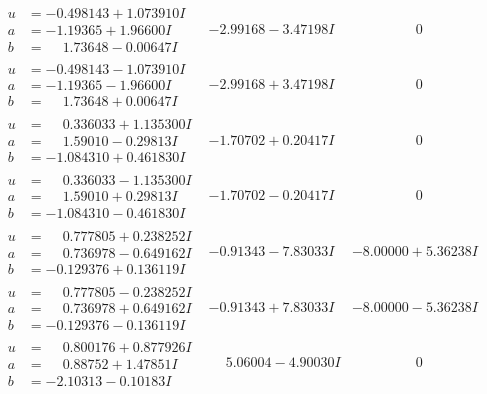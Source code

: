 \documentclass[1p]{elsarticle_modified}
\theoremstyle{definition}
\begin{document}
$$\begin{array}{c|c|c}
\begin{aligned}
u &= -0.498143 + 1.073910 I \\
a &= -1.19365 + 1.96600 I \\
b &= \phantom{-}1.73648 - 0.00647 I\end{aligned}
 & -2.99168 - 3.47198 I & \phantom{-0.000000 } 0 \\ \hline\begin{aligned}
u &= -0.498143 - 1.073910 I \\
a &= -1.19365 - 1.96600 I \\
b &= \phantom{-}1.73648 + 0.00647 I\end{aligned}
 & -2.99168 + 3.47198 I & \phantom{-0.000000 } 0 \\ \hline\begin{aligned}
u &= \phantom{-}0.336033 + 1.135300 I \\
a &= \phantom{-}1.59010 - 0.29813 I \\
b &= -1.084310 + 0.461830 I\end{aligned}
 & -1.70702 + 0.20417 I & \phantom{-0.000000 } 0 \\ \hline\begin{aligned}
u &= \phantom{-}0.336033 - 1.135300 I \\
a &= \phantom{-}1.59010 + 0.29813 I \\
b &= -1.084310 - 0.461830 I\end{aligned}
 & -1.70702 - 0.20417 I & \phantom{-0.000000 } 0 \\ \hline\begin{aligned}
u &= \phantom{-}0.777805 + 0.238252 I \\
a &= \phantom{-}0.736978 - 0.649162 I \\
b &= -0.129376 + 0.136119 I\end{aligned}
 & -0.91343 - 7.83033 I & -8.00000 + 5.36238 I \\ \hline\begin{aligned}
u &= \phantom{-}0.777805 - 0.238252 I \\
a &= \phantom{-}0.736978 + 0.649162 I \\
b &= -0.129376 - 0.136119 I\end{aligned}
 & -0.91343 + 7.83033 I & -8.00000 - 5.36238 I \\ \hline\begin{aligned}
u &= \phantom{-}0.800176 + 0.877926 I \\
a &= \phantom{-}0.88752 + 1.47851 I \\
b &= -2.10313 - 0.10183 I\end{aligned}
 & \phantom{-}5.06004 - 4.90030 I & \phantom{-0.000000 } 0 \\ \hline\begin{aligned}

\end{aligned}
\end{array}$$
\end{document}
